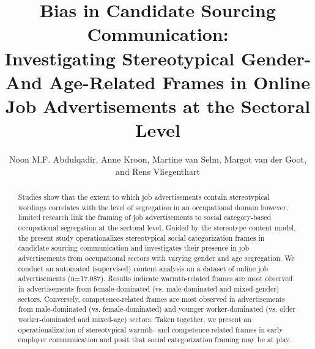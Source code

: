 \documentclass[Royal,sageapa,times]{sagej}
\begin{document}

\title{Bias in Candidate Sourcing Communication:\\
Investigating Stereotypical Gender- And Age-Related Frames in Online Job Advertisements at the Sectoral Level}

\author{Noon M.F. Abdulqadir, Anne Kroon, Martine van Selm, Margot van der Goot, and Rens Vliegenthart}




\begin{abstract}
    Studies show that the extent to which job advertisements contain stereotypical wordings correlates with the level of segregation in an occupational domain however, limited research link the framing of job advertisements to social category-based occupational segregation at the sectoral level. Guided by the stereotype content model, the present study operationalizes stereotypical social categorization frames in candidate sourcing communication and investigates their presence in job advertisements from occupational sectors with varying gender and age segregation. We conduct an automated (supervised) content analysis on a dataset of online job advertisements (n=17,087). Results indicate warmth-related frames are most observed in advertisements from female-dominated (vs. male-dominated and mixed-gender) sectors. Conversely, competence-related frames are most observed in advertisements from male-dominated (vs. female-dominated) and younger worker-dominated (vs. older worker-dominated and mixed-age) sectors. Taken together, we present an operationalization of stereotypical warmth- and competence-related frames in early employer communication and posit that social categorization framing may be at play.
\end{abstract}


\maketitle
\end{document}
